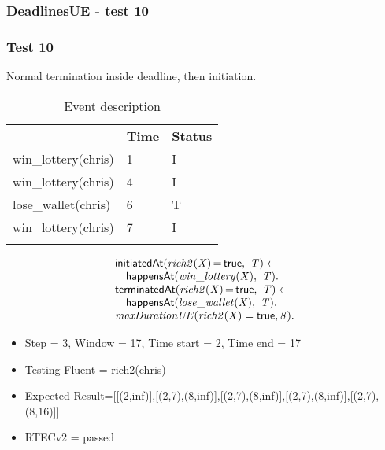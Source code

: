 \documentclass[8pt]{beamer}
\DeclareMathOperator{\val}{=}  %
\def \patsize {}
\def\happensAt{\textsf{\patsize happensAt}}
\def\initiatedAt{\textsf{\patsize initiatedAt}}
\def\terminatedAt{\textsf{\patsize terminatedAt}}
\def\true{\textsf{\patsize true}}
\newenvironment{mysplit}%
  {\arraycolsep 0pt \begin{array}{l}}%
  {\end{array}}
\begin{document}
\begin{frame}
    \frametitle{DeadlinesUE - test 10}
    \subsubsection{Test 10}
    \small
    Normal termination inside deadline, then initiation.\linebreak
    \begin{minipage}{0.48\linewidth}
        \begin{table}[t!]
            \caption{Event description}
            \begin{center}

                \begin{tabular}{lll}
                    \hline\noalign{\smallskip}
                    \multicolumn{1}{l}{\textbf{Event}} & \multicolumn{1}{c}{\textbf{Time}} & \multicolumn{1}{c}{\textbf{Status}} \\
                    win\_lottery(chris)& 1 & I\\
                    win\_lottery(chris)& 4 & I\\
                    lose\_wallet(chris)& 6 & T\\
                    win\_lottery(chris)& 7 & I\\
                    \noalign{\smallskip}
                    \hline
                \end{tabular}
            \end{center}
        \end{table}
    \end{minipage}
    \begin{minipage}{0.48\linewidth}
        \begin{align*}
            \begin{mysplit}
                \initiatedAt\mathit{(rich2(X)\val\true,\ T) \leftarrow}\\
                \quad    \happensAt\mathit{(win\_lottery(X),\ T)}.\\
                \terminatedAt\mathit{(rich2(X)\val\true,\ T) \leftarrow}\\
                \quad    \happensAt\mathit{(lose\_wallet(X),\ T)}.\\
                \mathit{maxDurationUE(rich2(X)=\true,8)}.\\
            \end{mysplit}
        \end{align*}
    \end{minipage}
    \begin{itemize}
        \item Step = 3, Window = 17, Time start = 2, Time end = 17
        \item Testing Fluent = rich2(chris)
        \item Expected Result=[[(2,inf)],[(2,7),(8,inf)],[(2,7),(8,inf)],[(2,7),(8,inf)],[(2,7),(8,16)]]
        \item RTECv2 = passed
    \end{itemize}
\end{frame}
\end{document}
